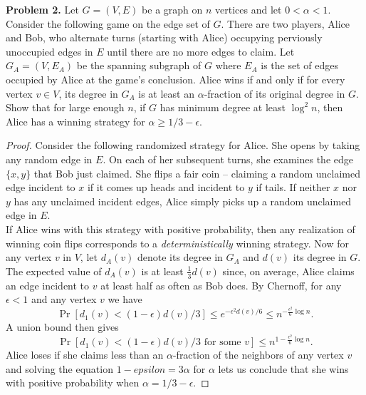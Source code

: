 \documentclass[11pt,letterpaper]{report}
\begin{document}
\noindent\textbf{Problem 2. }
Let $G = (V, E)$ be a graph on $n$ vertices and let $0<\alpha<1$.
Consider the following game on the edge set of $G$.
There are two players, Alice and Bob, who alternate turns (starting with Alice) occupying perviously unoccupied edges in $E$ until there are no more edges to claim.
Let $G_A = (V, E_A)$ be the spanning subgraph of $G$ where $E_A$ is the set of edges occupied by Alice at the game's conclusion.
Alice wins if and only if for every vertex $v\in V$, its degree in $G_A$ is at least an $\alpha$-fraction of its original degree in $G$.\\

Show that for large enough $n$, if $G$ has minimum degree at least $\log^2n$, then Alice has a winning strategy for $\alpha\geq 1/3 - \epsilon$.

\begin{proof}
    Consider the following randomized strategy for Alice.
    She opens by taking any random edge in $E$.
    On each of her subsequent turns, she examines the edge $\{x,y\}$ that Bob just claimed.
    She flips a fair coin -- claiming a random unclaimed edge incident to $x$ if it comes up heads and incident to $y$ if tails.
    If neither $x$ nor $y$ has any unclaimed incident edges, Alice simply picks up a random unclaimed edge in $E$.\\

    If Alice wins with this strategy with positive probability, then any realization of winning coin flips corresponds to a \emph{deterministically} winning strategy.
    Now for any vertex $v$ in $V$, let $d_A(v)$ denote its degree in $G_A$ and $d(v)$ its degree in $G$.
    The expected value of $d_A(v)$ is at least $\frac{1}{3}d(v)$ since, on average, Alice claims an edge incident to $v$ at least half as often as Bob does.
    By Chernoff, for any $\epsilon<1$ and any vertex $v$ we have
    \[\Pr[d_1(v) < (1-\epsilon)d(v)/3] \leq e^{-\epsilon^2d(v)/6} \leq n^{-\frac{\epsilon^2}{6}\log n}.\]
    A union bound then gives
    \[
        \Pr[d_1(v)<(1-\epsilon)d(v)/3\text{ for some }v] \leq n^{1-\frac{\epsilon^2}{6}\log n}.
    \]
    Alice loses if she claims less than an $\alpha$-fraction of the neighbors of any vertex $v$ and solving the equation $1-epsilon = 3\alpha$ for $\alpha$ lets us conclude that she wins with positive probability when $\alpha = 1/3 - \epsilon$.
\end{proof}
\end{document}
